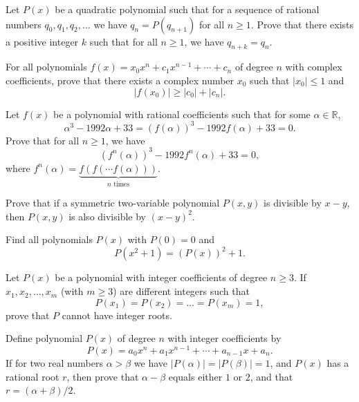 \documentclass[12pt,a4paper]{memoir}
\theoremstyle{definition}
\begin{document}
\begin{question}
	Let $P(x)$ be a quadratic polynomial such that for a sequence of rational numbers $q_0,q_1,q_2,\dots$ we have $q_n = P(q_{n+1})$ for all $n \geq 1$. Prove that there exists a positive integer $k$ such that for all $n\geq 1$, we have $q_{n+k}=q_n$.
\end{question}


\begin{question}[name={1994 China}]
	For all polynomials $f(x)=x_0x^n + c_1x^{n-1} + \cdots + c_n$ of degree $n$ with complex coefficients, prove that there exists a complex number $x_0$ such that $|x_0| \leq 1$ and \[|f(x_0)| \geq |c_0| + |c_n|.\]
\end{question}


\begin{question}
	Let $f(x)$ be a polynomial with rational coefficients such that for some $\alpha \in \mathbb R$,
	\[\alpha^3 - 1992 \alpha + 33 = (f(\alpha))^3 - 1992 f(\alpha) + 33 = 0.\]
	Prove that for all $n\geq 1$, we have
	\[(f^n(\alpha))^3 - 1992 f^n(\alpha) + 33=0,\]
	where $f^n(\alpha) = \underbrace{f(f(\cdots f(\alpha)))}_{n \text{ times}}$.
\end{question}


\begin{question}
	Prove that if a symmetric two-variable polynomial $P(x,y)$ is divisible by $x-y$, then $P(x,y)$ is also divisible by $(x-y)^2$.
\end{question}

\begin{question}
	Find all polynomials $P(x)$ with $P(0)=0$ and
	\[P(x^2+1) = (P(x))^2 + 1.\]
\end{question}


\begin{question}[name={1986 Czech And Slovak}]
	Let $P(x)$ be a polynomial with integer coefficients of degree $n \ge 3$. If $x_1,x_2,\dots,x_m$ (with $m \ge 3$) are different integers such that \[P(x_1) = P(x_2) = \dots = P(x_m) = 1,\] prove that $P$ cannot have integer roots.
\end{question}


\begin{question}
	Define polynomial $P(x)$ of degree $n$ with integer coefficients by
	\[P(x) = a_0x^n + a_1x^{n-1} + \cdots + a_{n-1}x + a_n.\]
	If for two real numbers $\alpha > \beta$ we have $|P(\alpha)|=|P(\beta)|=1$, and $P(x)$ has a rational root $r$, then prove that $\alpha-\beta$ equals either $1$ or $2$, and that $r=(\alpha+\beta)/2$.
\end{question}
\end{document}
